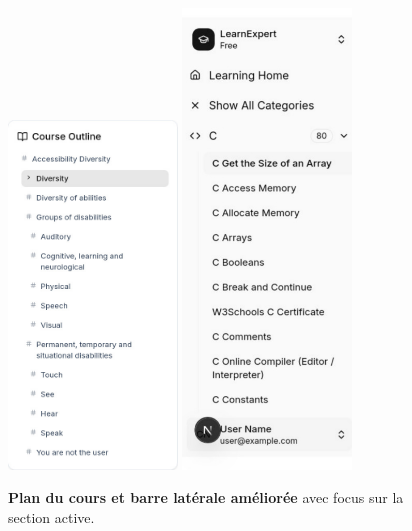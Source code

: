 \begin{figure}[H]
  \centering
  \includegraphics[width=0.4\textwidth,keepaspectratio]{old-reports/week_4_img/outline.jpeg}
  \includegraphics[width=0.4\textwidth,keepaspectratio]{old-reports/week_4_img/sidebare2.jpeg}
  \caption{\textbf{Plan du cours et barre latérale améliorée} avec focus sur la section active.}
  \label{fig:navigation_improved}
\end{figure}

